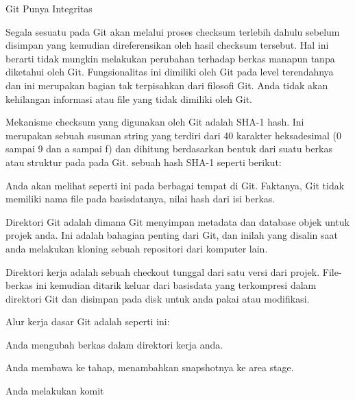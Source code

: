 \vspace{12pt}
\vspace{12pt}
\noindent 
 \hspace*{0.5in} Git Punya Integritas \par
\noindent 
Segala sesuatu pada Git akan melalui proses checksum terlebih dahulu sebelum disimpan yang kemudian direferensikan oleh hasil checksum tersebut. Hal ini berarti tidak mungkin melakukan perubahan terhadap berkas manapun tanpa diketahui oleh Git. Fungsionalitas ini dimiliki oleh Git pada level terendahnya dan ini merupakan bagian tak terpisahkan dari filosofi Git. Anda tidak akan kehilangan informasi atau file yang tidak dimiliki oleh Git. \par
\noindent 
 \hspace*{0.5in} Mekanisme checksum yang digunakan oleh Git adalah SHA-1 hash. Ini merupakan sebuah susunan string yang terdiri dari 40 karakter heksadesimal (0 sampai 9 dan a sampai f) dan dihitung berdasarkan bentuk dari suatu berkas atau struktur pada pada Git. sebuah hash SHA-1 seperti berikut: \par
\noindent 
Anda akan melihat seperti ini pada berbagai tempat di Git. Faktanya, Git tidak memiliki nama file pada basisdatanya, nilai hash dari isi berkas. \par
\vspace{12pt}
\noindent 
Direktori Git adalah dimana Git menyimpan metadata dan database objek untuk projek anda. Ini adalah bahagian penting dari Git, dan inilah yang disalin saat anda melakukan kloning sebuah repositori dari komputer lain. \par
\vspace{12pt}
\noindent 
Direktori kerja adalah sebuah checkout tunggal dari satu versi dari projek. File-berkas ini kemudian ditarik keluar dari basisdata yang terkompresi dalam direktori Git dan disimpan pada disk untuk anda pakai atau modifikasi. \par
\vspace{12pt}
\noindent 
 \hspace*{0.5in} Alur kerja dasar Git adalah seperti ini: \par
\noindent 
 \hspace*{0.5in} Anda mengubah berkas dalam direktori kerja anda. \par
\noindent 
 \hspace*{0.5in} Anda membawa ke tahap, menambahkan snapshotnya ke area stage. \par
\noindent 
 \hspace*{0.5in} Anda melakukan komit \par
